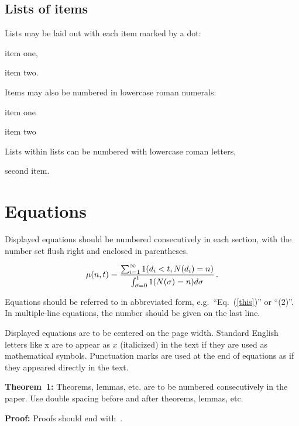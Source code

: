 \documentclass[twoside]{article}
\begin{document}
\subsection{Lists of items}
\noindent
Lists may be laid out with each item marked by a dot:
\begin{itemlist}
 \item item one,
 \item item two.
\end{itemlist}
Items may also be numbered in lowercase roman numerals:
\begin{romanlist}
 \item item one
 \item item two
          \begin{alphlist}
          \item Lists within lists can be numbered with lowercase
              roman letters,
          \item second item.
          \end{alphlist}
\end{romanlist}

\section{Equations}
\noindent
Displayed equations should be numbered consecutively in each
section, with the number set flush right and enclosed in
parentheses.

\begin{equation}
\mu(n, t) = {
\sum^\infty_{i=1} 1(d_i < t, N(d_i) = n) \over \int^t_{\sigma=0} 1(N(\sigma) 
= n)d\sigma}\,. \label{this}
\end{equation}

Equations should be referred to in abbreviated form,
e.g.~``Eq.~(\ref{this})'' or ``(2)''. In multiple-line
equations, the number should be given on the last line.

Displayed equations are to be centered on the page width.
Standard English letters like x are to appear as $x$
(italicized) in the text if they are used as mathematical
symbols. Punctuation marks are used at the end of equations as
if they appeared directly in the text.

\vspace*{12pt}
\noindent
{\bf Theorem~1:} Theorems, lemmas, etc. are to be numbered
consecutively in the paper. Use double spacing before and after
theorems, lemmas, etc.

\vspace*{12pt}
\noindent
{\bf Proof:} Proofs should end with \square\,.
\end{document}
